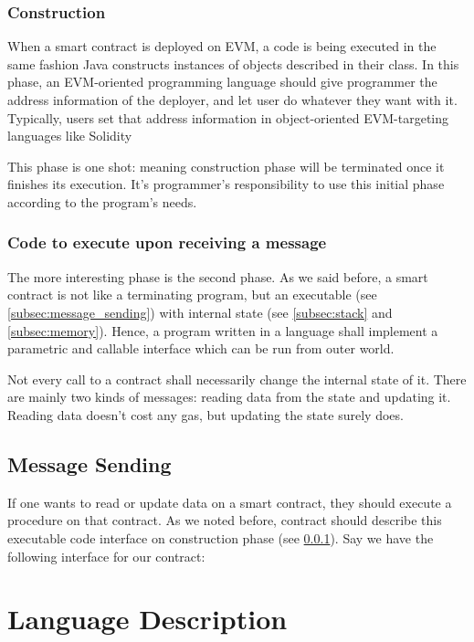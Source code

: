 \documentclass{article}
\begin{document}
\subsubsection{Construction}
\label{subsubsec:construction}
\par When a smart contract is deployed on EVM, a code is being executed in the same fashion Java\cite{java} constructs instances of objects described in their class. In this phase, an EVM-oriented programming language should give programmer the address information of the deployer, and let user do whatever they want with it. Typically, users set that address information in object-oriented EVM-targeting languages like Solidity\cite{solidity}
\par This phase is one shot: meaning construction phase will be terminated once it finishes its execution. It's programmer's responsibility to use this initial phase according to the program's needs.
\subsubsection{Code to execute upon receiving a message}
\par The more interesting phase is the second phase. As we said before, a smart contract is not like a terminating program, but an executable (see \ref{subsec:message_sending}) with internal state (see \ref{subsec:stack} and \ref{subsec:memory}). Hence, a program written in a language shall implement a parametric and callable interface which can be run from outer world.
\par Not every call to a contract shall necessarily change the internal state of it. There are mainly two kinds of messages: reading data from the state and updating it. Reading data doesn't cost any gas, but updating the state surely does.
\subsection{Message Sending}
If one wants to read or update data on a smart contract, they should execute a procedure on that contract. As we noted before, contract should describe this executable code interface on construction phase (see \ref{subsubsec:construction}). Say we have the following interface for our contract:
\newpage

\label{subsec:message_sending}
\section{Language Description}
\label{sec:language_description}
\end{document}
